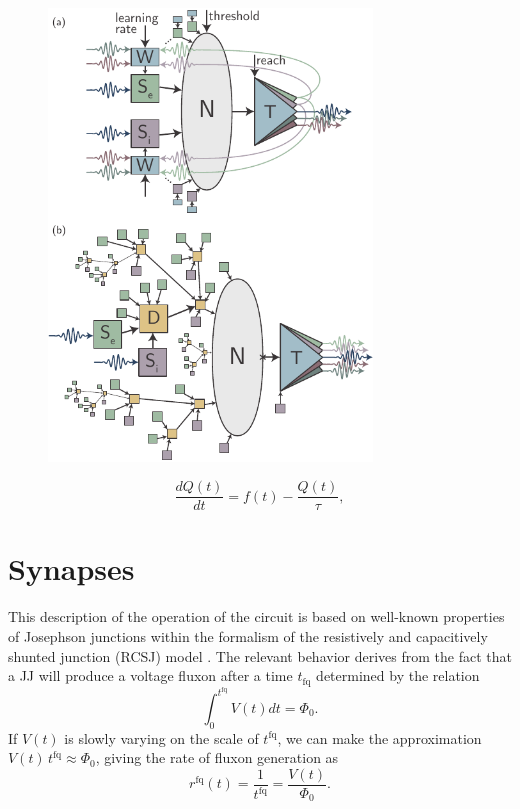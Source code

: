 \documentclass[twocolumn]{article}
\begin{document}
\begin{figure}[h!]
\includegraphics[width=8.6cm]{figures/_fig__schematics.pdf}
\end{figure}

\begin{equation}
\label{eq:leaky_integrator}
\frac{dQ(t)}{dt} = f(t)-\frac{Q(t)}{\tau},
\end{equation}


\section{\label{sec:synapses}Synapses}


This description of the operation of the circuit is based on well-known properties of Josephson junctions within the formalism of the resistively and capacitively shunted junction (RCSJ) model \cite{vatu1998,ka1999,ti1996}. The relevant behavior derives from the fact that a JJ will produce a voltage fluxon after a time $t_{\mathrm{fq}}$ determined by the relation
\begin{equation}
\label{eq:jj__fluxon_production}
\int_0^{t^{\mathrm{fq}}}V(t)dt = \Phi_0.
\end{equation}
If $V(t)$ is slowly varying on the scale of $t^{\mathrm{fq}}$, we can make the approximation $V(t)\,t^{\mathrm{fq}} \approx \Phi_0$, giving the rate of fluxon generation as
\begin{equation}
\label{eq:jj__fluxon_rate}
r^{\mathrm{fq}}(t) =  \frac{1}{t^{\mathrm{fq}}} = \frac{V(t)}{\Phi_0}.
\end{equation}
\end{document}

